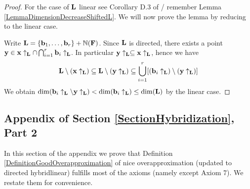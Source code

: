\begin{proof}
For the case of \(\mathbf{L}\) linear see Corollary D.3 of \cite{Leroux13}/ remember Lemma \ref{LemmaDimensionDecreaseShiftedL}. We will now prove the lemma by reducing to the linear case.

Write \(\mathbf{L}=\{\mathbf{b}_1, \dots, \mathbf{b}_r\}+\mathbb{N}(\mathbf{F})\). Since \(\mathbf{L}\) is directed, there exists a point \(\mathbf{y} \in \mathbf{x} \uparrow_{\mathbf{L}} \cap \bigcap_{i=1}^r \mathbf{b}_i \uparrow_{\mathbf{L}}\). In particular \(\mathbf{y} \uparrow_{\mathbf{L}} \subseteq \mathbf{x} \uparrow_{\mathbf{L}}\), hence we have 
\[\mathbf{L} \setminus (\mathbf{x} \uparrow_{\mathbf{L}}) \subseteq \mathbf{L} \setminus (\mathbf{y} \uparrow_{\mathbf{L}}) \subseteq \bigcup_{i=1}^r [(\mathbf{b}_i \uparrow_{\mathbf{L}}) \setminus (\mathbf{y} \uparrow_{\mathbf{L}})]\]
We obtain \(\dim(\mathbf{b}_i \uparrow_{\mathbf{L}} \setminus \mathbf{y} \uparrow_{\mathbf{L}}) < \dim(\mathbf{b}_i \uparrow_{\mathbf{L}})\leq \dim(\mathbf{L})\) by the linear case.
\end{proof}








\subsection{Appendix of Section \ref{SectionHybridization}, Part 2}

In this section of the appendix we prove that Definition \ref{DefinitionGoodOverapproximation} of nice overapproximation (updated to directed hybridlinear) fulfills most of the axioms (namely except Axiom 7). We restate them for convenience.

\DefinitionAxioms*

\LemmaModelAxiomsVASSnz*

